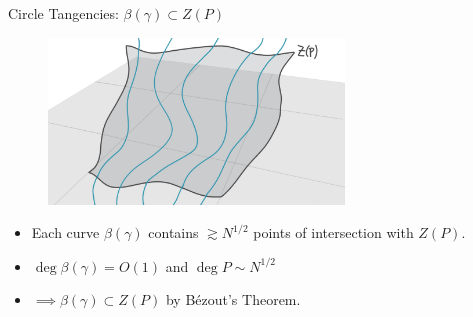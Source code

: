 \documentclass{beamer}
\newcommand{\nfr}[1]{\begin{frame} #1
\end{frame}}
\begin{document}
\nfr{{Circle Tangencies: $\beta(\gamma) \subset Z(P)$}
\begin{figure}[h]
    \centering
    \includegraphics[width=0.7\textwidth]{images/lots_of_dots_g.png}
\end{figure}
\begin{itemize}
    \item Each curve $\beta(\gamma)$ contains $\gtrsim N^{1/2}$ points of intersection with $Z(P)$.
    \item $\deg \beta(\gamma) = O (1)$ and $\deg P \sim N^{1/2}$
    \item $\implies \beta(\gamma) \subset Z(P)$ by Bézout's Theorem.
\end{itemize}
}
\end{document}
